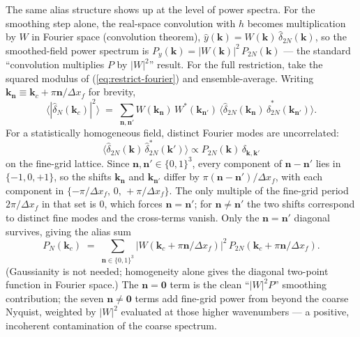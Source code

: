 \documentclass[12pt]{article}
\begin{document}
The same alias structure shows up at the level of power spectra. For
the smoothing step alone, the real-space convolution with $h$
becomes multiplication by $W$ in Fourier space (convolution theorem),
$\hat y(\mathbf k) = W(\mathbf k)\,\hat\delta_{2N}(\mathbf k)$, so the smoothed-field power spectrum is
$P_y(\mathbf k) = |W(\mathbf k)|^2\,P_{2N}(\mathbf k)$ --- the standard
``convolution multiplies $P$ by $|W|^2$'' result. For the full
restriction, take the squared modulus of (\ref{eq:restrict-fourier})
and ensemble-average. Writing $\mathbf k_{\mathbf n}\equiv\mathbf
k_c+\pi\mathbf n/\Delta x_f$ for brevity,
\begin{equation}
  \bigl\langle|\hat\delta_N(\mathbf k_c)|^2\bigr\rangle
  \;=\; \sum_{\mathbf n,\mathbf n'} W(\mathbf k_{\mathbf n})\,
        W^*(\mathbf k_{\mathbf n'})\,
        \bigl\langle\hat\delta_{2N}(\mathbf k_{\mathbf n})\,
                    \hat\delta_{2N}^*(\mathbf k_{\mathbf n'})\bigr\rangle.
\end{equation}
For a statistically homogeneous field, distinct Fourier modes are
uncorrelated:
\begin{equation*}
\langle\hat\delta_{2N}(\mathbf k)\,\hat\delta_{2N}^*(\mathbf k')\rangle
\propto P_{2N}(\mathbf k)\,\delta_{\mathbf k,\mathbf k'}
\end{equation*}
on the fine-grid lattice. Since $\mathbf n,\mathbf n'\in\{0,1\}^3$, every component of
$\mathbf n-\mathbf n'$ lies in $\{-1,0,+1\}$, so the shifts
$\mathbf k_{\mathbf n}$ and $\mathbf k_{\mathbf n'}$ differ by
$\pi(\mathbf n-\mathbf n')/\Delta x_f$, with each component in
$\{-\pi/\Delta x_f,\,0,\,+\pi/\Delta x_f\}$. The only multiple of the
fine-grid period $2\pi/\Delta x_f$ in that set is $0$, which forces
$\mathbf n=\mathbf n'$; for $\mathbf n\ne\mathbf n'$ the two shifts
correspond to distinct fine modes and the cross-terms vanish. Only
the $\mathbf n=\mathbf n'$ diagonal survives, giving the alias sum
\begin{equation}\label{eq:Pk-alias}
  P_N(\mathbf k_c) \;=\; \sum_{\mathbf n\in\{0,1\}^3}
        \bigl|W(\mathbf k_c+\pi\mathbf n/\Delta x_f)\bigr|^2\,
        P_{2N}(\mathbf k_c+\pi\mathbf n/\Delta x_f).
\end{equation}
(Gaussianity is not needed; homogeneity alone gives the diagonal
two-point function in Fourier space.)
The $\mathbf n=\mathbf 0$ term is the clean ``$|W|^2 P$'' smoothing
contribution; the seven $\mathbf n\ne\mathbf 0$ terms add fine-grid
power from beyond the coarse Nyquist, weighted by $|W|^2$ evaluated at
those higher wavenumbers --- a positive, incoherent contamination of
the coarse spectrum.
\end{document}
